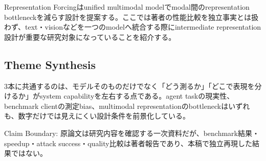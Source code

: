 Representation Forcingはunified multimodal modelでmodal間のrepresentation bottleneckを減らす設計を提案する。ここでは著者の性能比較を独立事実とは扱わず、text・visionなどを一つのmodelへ統合する際にintermediate representation設計が重要な研究対象になっていることを紹介する。\autocite{src-99d7ea892e92}


\subsection{Theme Synthesis}

3本に共通するのは、モデルそのものだけでなく「どう測るか」「どこで表現を分けるか」がsystem capabilityを左右する点である。agent taskの現実性、benchmark clientの測定bias、multimodal representationのbottleneckはいずれも、数字だけでは見えにくい設計条件を前景化している。\autocite{src-24add4f36a45,src-99d7ea892e92,src-ea2dcbeedd27}


\begin{claimboundary}
Claim Boundary: 原論文は研究内容を確認する一次資料だが、benchmark結果・speedup・attack success・quality比較は著者報告であり、本稿で独立再現した結果ではない。\autocite{src-24add4f36a45,src-99d7ea892e92,src-ea2dcbeedd27}
\end{claimboundary}
